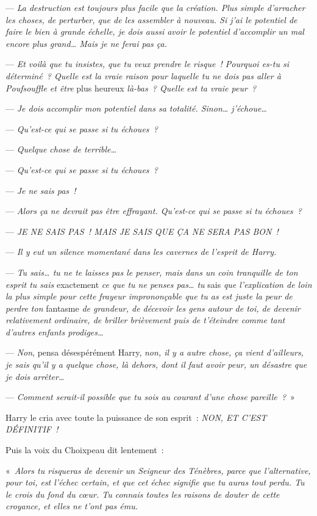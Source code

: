 --- \emph{La destruction est toujours plus facile que la création. Plus simple d'arracher les choses, de perturber, que de les assembler à nouveau. Si j'ai le potentiel de faire le bien à grande échelle, je dois aussi avoir le potentiel d'accomplir un mal encore plus grand… Mais je ne ferai pas ça.}

--- \emph{Et voilà que tu insistes, que tu veux prendre le risque~! Pourquoi es-tu si déterminé~? Quelle est la vraie raison pour laquelle tu ne dois pas aller à Poufsouffle et être} plus heureux \emph{là-bas~? Quelle est ta vraie peur~?}

--- \emph{Je dois accomplir mon potentiel dans sa totalité. Sinon… j'échoue…}

--- \emph{Qu'est-ce qui se passe si tu échoues~?}

--- \emph{Quelque chose de terrible…}

--- \emph{Qu'est-ce qui se passe si tu échoues~?}

--- \emph{Je ne sais pas~!}

--- \emph{Alors ça ne devrait pas être effrayant. Qu'est-ce qui se passe si tu échoues~?}

--- \emph{JE NE SAIS PAS~! MAIS JE SAIS QUE ÇA NE SERA PAS BON~!}

--- \emph{Il y eut un silence momentané dans les cavernes de l'esprit de Harry.}

--- \emph{Tu sais… tu ne te laisses pas le penser, mais dans un coin tranquille de ton esprit tu sais} exactement \emph{ce que tu ne penses pas… tu} sais \emph{que l'explication de loin la plus simple pour cette frayeur imprononçable que tu as est juste la peur de perdre ton} fantasme \emph{de grandeur, de décevoir les gens autour de toi, de devenir relativement ordinaire, de briller brièvement puis de t'éteindre comme tant d'autres enfants prodiges…}

--- \emph{Non}, pensa désespérément Harry, \emph{non, il y a autre chose, ça vient d'ailleurs, je sais qu'il y a quelque chose, là dehors, dont il faut avoir peur, un désastre que je dois arrêter…}

--- \emph{Comment serait-il possible que tu sois au courant d'une chose pareille~?}~»

Harry le cria avec toute la puissance de son esprit~: \emph{NON, ET C'EST DÉFINITIF~!}

Puis la voix du Choixpeau dit lentement~:

«~\emph{Alors tu risqueras de devenir un Seigneur des Ténèbres, parce que l'alternative, pour toi, est l'échec certain, et que cet échec signifie que tu auras tout perdu. Tu le crois du fond du cœur. Tu connais toutes les raisons de douter de cette croyance, et elles ne t'ont pas ému.}

